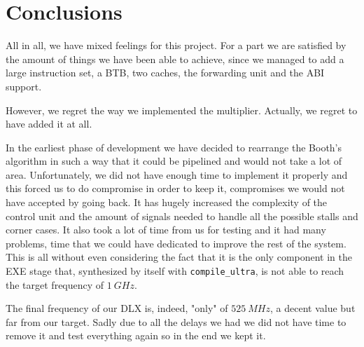\chapter{Conclusions}
\label{chap:conclusions}

All in all, we have mixed feelings for this project. For a part we are satisfied by the amount of things we have been able to achieve,
since we managed to add a large instruction set, a BTB, two caches, the forwarding unit and the ABI support.

However, we regret the way we implemented the multiplier. Actually, we regret to have added it at all.

In the earliest phase
of development we have decided to rearrange the Booth's algorithm in such a way that it could be pipelined and would not take a lot of area.
Unfortunately, we did not have enough time to implement it properly and this forced us to do compromise in order to keep it, compromises we
would not have accepted by going back. It has hugely increased the complexity of the control unit and the amount of signals needed to handle
all the possible stalls and corner cases. It also took a lot of time from us for testing and it had many problems, time that we could have
dedicated to improve the rest of the system. This is all without even considering the fact that it is the only component in the EXE stage that,
synthesized by itself with \verb|compile_ultra|, is not able to reach the target frequency of $1\ GHz$.

The final frequency of our DLX is, indeed, "only" of $525\ MHz$, a decent value but far from our target. Sadly due to all the delays we had
we did not have time to remove it and test everything again so in the end we kept it.